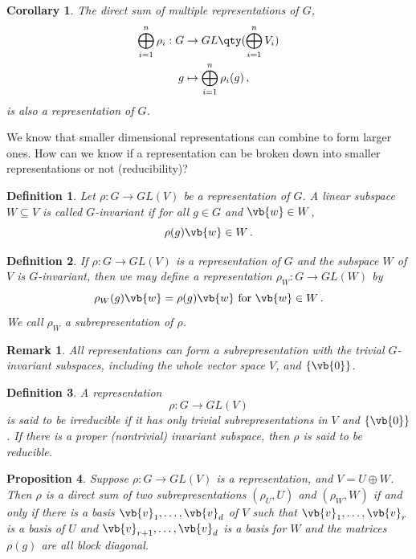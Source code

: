 \documentclass{article}
\theoremstyle{plain}\theoremheaderfont{\normalfont\itshape}\theorembodyfont{\rmfamily}\theoremseparator{.}\newtheorem*{rem}{Remark}\newtheorem*{ex}{Example}\newtheorem*{proof}{Proof}\newtheorem*{altp}{Alternative proof}
\theoremstyle{plain}\theoremheaderfont{\normalfont\bfseries}\theorembodyfont{\rmfamily}\theoremseparator{.}\newtheorem{thm}{Theorem}[section]\newtheorem{lem}[thm]{Lemma}\newtheorem{prop}[thm]{Proposition}\newtheorem*{cor}{Corollary}\newtheorem{defn}[thm]{Definition}\newtheorem{clm}[thm]{Claim}\newtheorem{clminproof}{Claim}
\theoremstyle{break}\theoremheaderfont{\normalfont\itshape}\theorembodyfont{\rmfamily}\theoremseparator{.\medskip}\newtheorem*{proofskip}{Proof}\newtheorem*{exs}{Examples}\newtheorem*{rems}{Remarks}
\theoremstyle{break}\theoremheaderfont{\normalfont\bfseries}\theorembodyfont{\rmfamily}\theoremseparator{.\medskip}\newtheorem{lemskip}[thm]{Lemma}\newtheorem{defnskip}[thm]{Definition}\newtheorem{propskip}[thm]{Proposition}\newtheorem{thmskip}[thm]{Theorem}
\numberwithin{equation}{section}
\begin{document}
	\begin{cor}
		The direct sum of multiple representations of \(G\),
		\begin{align*}
			\bigoplus_{i=1}^{n}\rho_i: G&\to GL\qty(\bigoplus_{i=1}^{n}V_i)\\
			g&\mapsto \bigoplus_{i=1}^{n}\rho_i(g)\,,
		\end{align*}
		is also a representation of \(G\).
	\end{cor}
	We know that smaller dimensional representations can combine to form larger ones. How can we know if a representation can be broken down into smaller representations or not (reducibility)?
	\begin{defn}
		Let \(\rho:G\to GL(V)\) be a representation of \(G\). A linear subspace \(W\subseteq V\) is called \textit{\(G\)-invariant} if for all \(g\in G\) and \(\vb{w}\in W\),
		\[\rho(g)\vb{w}\in W\,.\]
	\end{defn}
	\begin{defn}
		If \(\rho:G\to GL(V)\) is a representation of \(G\) and the subspace \(W\) of \(V\) is \(G\)-invariant, then we may define a representation \(\rho_W:G\to GL(W)\) by
		\[\rho_W(g)\vb{w}=\rho(g)\vb{w}\text{ for }\vb{w}\in W\,.\]
		We call \(\rho_W\) a \textit{subrepresentation} of \(\rho\).
	\end{defn}
	\begin{rem}
		All representations can form a subrepresentation with the \textit{trivial \(G\)-invariant subspaces}, including the whole vector space \(V\), and \(\{\vb{0}\}\).
	\end{rem}
	\begin{defn}
		A representation 
		\[\rho:G\to GL(V)\] is said to be \textit{irreducible} if it has only trivial subrepresentations in \(V\) and \(\{\vb{0}\}\). If there is a proper (nontrivial) invariant subspace, then \(\rho\) is said to be \textit{reducible}.
	\end{defn}
	\begin{prop}
		Suppose \(\rho:G\to GL(V)\) is a representation, and \(V = U\oplus W\). Then \(\rho\) is a direct sum of two subrepresentations \((\rho_U,U)\) and \((\rho_W,W)\) if and only if there is a basis \(\vb{v}_1,\dots,\vb{v}_d\) of \(V\) such that \(\vb{v}_1,\dots,\vb{v}_r\) is a basis of \(U\) and \(\vb{v}_{r+1},\dots,\vb{v}_d\) is a basis for \(W\) and the matrices \(\rho(g)\) are all block diagonal.
	\end{prop}
\end{document}
